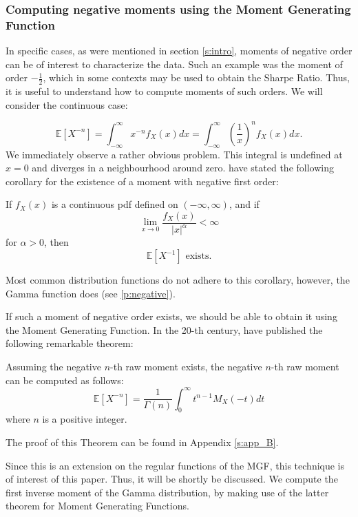 \subsubsection{Computing negative moments using the Moment Generating Function}
In specific cases, as were mentioned in section \ref{s:intro}, moments of negative order can be of interest to characterize the data. Such an example was the moment of order \(-\frac{1}{2}\), which in some contexts may be used to obtain the Sharpe Ratio. Thus, it is useful to understand how to compute moments of such orders. We will consider the continuous case:

\[\mathbb{E}[X^{-n}] = \int_{-\infty}^{\infty} x^{-n} f_X(x) dx = \int_{-\infty}^{\infty} \left(\frac{1}{x}\right)^n f_X(x) dx.\] We immediately observe a rather obvious problem. This integral is undefined at \(x = 0\) and diverges in a neighbourhood around zero. \cite{khuri2002} have stated the following corollary for the existence of a moment with negative first order:
\begin{corollary}
    If \(f_X(x)\) is a continuous pdf defined on \((-\infty, \infty)\), and if \[\lim_{x \to 0} \frac{f_X(x)}{|x|^\alpha} < \infty\] for \(\alpha > 0\), then \[\mathbb{E}[X^{-1}] \text{ exists}.\]
\end{corollary}

Most common distribution functions do not adhere to this corollary, however, the Gamma function does (see \ref{p:negative}).

If such a moment of negative order exists, we should be able to obtain it using the Moment Generating Function. In the 20-th century, \cite{cressie1981} have published the following remarkable theorem:

\begin{theorem}\label{t: negative}
    Assuming the negative \(n\)-th raw moment exists, the negative \(n\)-th raw moment can be computed as follows: 
    \[\mathbb{E}[X^{-n}] = \frac{1}{\Gamma(n)} \int_{0}^{\infty} t^{n- 1} M_X(-t) dt\] where \(n\) is a positive integer.
\end{theorem}
The proof of this Theorem can be found in Appendix \ref{s:app_B}.

Since this is an extension on the regular functions of the MGF, this technique is of interest of this paper. Thus, it will be shortly be discussed. We compute the first inverse moment of the Gamma distribution, by making use of the latter theorem for Moment Generating Functions.

